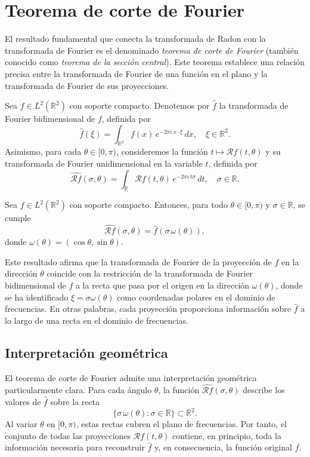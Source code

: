 \section{Teorema de corte de Fourier}

El resultado fundamental que conecta la transformada de Radon con la transformada de Fourier es el denominado \emph{teorema de corte de Fourier} (también conocido como \emph{teorema de la sección central}). Este teorema establece una relación precisa entre la transformada de Fourier de una función en el plano y la transformada de Fourier de sus proyecciones.

Sea $f \in L^{2}(\mathbb{R}^{2})$ con soporte compacto. Denotemos por $\widehat{f}$ la transformada de Fourier bidimensional de $f$, definida por
\[
\widehat{f}(\xi) = \int_{\mathbb{R}^{2}} f(x)\, e^{-2\pi i\, x \cdot \xi}\, dx, \quad \xi \in \mathbb{R}^{2}.
\]
Asimismo, para cada $\theta \in [0,\pi)$, consideremos la función $t \mapsto \mathcal{R}f(t,\theta)$ y su transformada de Fourier unidimensional en la variable $t$, definida por
\[
\widehat{\mathcal{R}f}(\sigma,\theta) = \int_{\mathbb{R}} \mathcal{R}f(t,\theta)\, e^{-2\pi i\, t \sigma}\, dt, \quad \sigma \in \mathbb{R}.
\]

\begin{theorem}
Sea $f \in L^{2}(\mathbb{R}^{2})$ con soporte compacto. Entonces, para todo $\theta \in [0,\pi)$ y $\sigma \in \mathbb{R}$, se cumple
\[
\widehat{\mathcal{R}f}(\sigma,\theta) = \widehat{f}(\sigma\, \omega(\theta)),
\]
donde $\omega(\theta) = (\cos\theta,\sin\theta)$.
\end{theorem}

Este resultado afirma que la transformada de Fourier de la proyección de $f$ en la dirección $\theta$ coincide con la restricción de la transformada de Fourier bidimensional de $f$ a la recta que pasa por el origen en la dirección $\omega(\theta)$, donde se ha identificado $\xi = \sigma \omega(\theta)$ como coordenadas polares en el dominio de frecuencias. En otras palabras, cada proyección proporciona información sobre $\widehat{f}$ a lo largo de una recta en el dominio de frecuencias.

\subsection*{Interpretación geométrica}

El teorema de corte de Fourier admite una interpretación geométrica particularmente clara. Para cada ángulo $\theta$, la función $\widehat{\mathcal{R}f}(\sigma,\theta)$ describe los valores de $\widehat{f}$ sobre la recta
\[
\{ \sigma\, \omega(\theta) : \sigma \in \mathbb{R} \} \subset \mathbb{R}^{2}.
\]
Al variar $\theta$ en $[0,\pi)$, estas rectas cubren el plano de frecuencias. Por tanto, el conjunto de todas las proyecciones $\mathcal{R}f(t,\theta)$ contiene, en principio, toda la información necesaria para reconstruir $\widehat{f}$ y, en consecuencia, la función original $f$.


